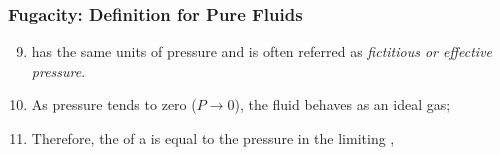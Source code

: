 \documentclass[10pt,compress,unknownkeysallowed]{beamer}
\begin{document}
\begin{frame}
  \frametitle{Fugacity: Definition for Pure Fluids}
        \begin{enumerate}\setcounter{enumi}{8}  
           \item<1->  has the same units of pressure and is often referred as {\it fictitious or effective pressure}.
           \item<2-> As pressure tends to zero ($P\rightarrow 0$), the fluid behaves as an ideal gas; 
           \item<3-> Therefore, the  of a  is equal to the pressure in the limiting , \ie
        \end{enumerate}
\end{frame}
\normalsize
\end{document}
